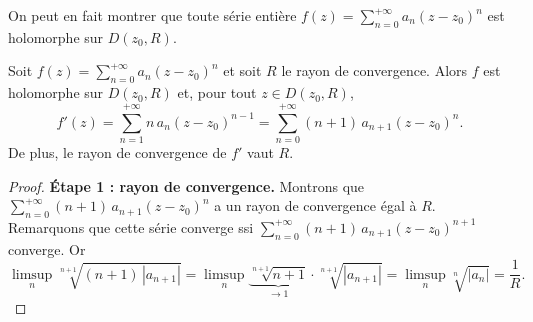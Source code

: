 On peut en fait montrer que toute série entière $f(z) = \sum_{n=0}^{+\infty} a_n (z-z_0)^n$ est holomorphe sur $D(z_0,R)$.

\begin{theoreme}\label{thm:derivation}
Soit $f(z) = \displaystyle\sum_{n=0}^{+\infty} a_n (z-z_0)^n$ et soit $R$ le rayon de convergence.
Alors $f$ est holomorphe sur $D(z_0,R)$ et, pour tout $z \in D(z_0,R)$,
\[
f'(z) = \sum_{n=1}^{+\infty} n\, a_n (z-z_0)^{n-1} = \sum_{n=0}^{+\infty} (n+1)\, a_{n+1} (z-z_0)^n .
\]
De plus, le rayon de convergence de $f'$ vaut $R$.
\end{theoreme}

\begin{proof}
\textbf{Étape 1 : rayon de convergence.}
Montrons que $\sum_{n=0}^{+\infty} (n+1)\, a_{n+1} (z-z_0)^n$ a un rayon de convergence égal à $R$.
Remarquons que cette série converge ssi $\sum_{n=0}^{+\infty} (n+1)\, a_{n+1} (z-z_0)^{n+1}$ converge. Or
\[
\limsup_n \sqrt[n+1]{(n+1)\,|a_{n+1}|}
= \limsup_n \underbrace{\sqrt[n+1]{n+1}}_{\to 1} \cdot \sqrt[n+1]{|a_{n+1}|}
= \limsup_n \sqrt[n]{|a_n|} = \frac{1}{R} .
\]


\end{proof}
